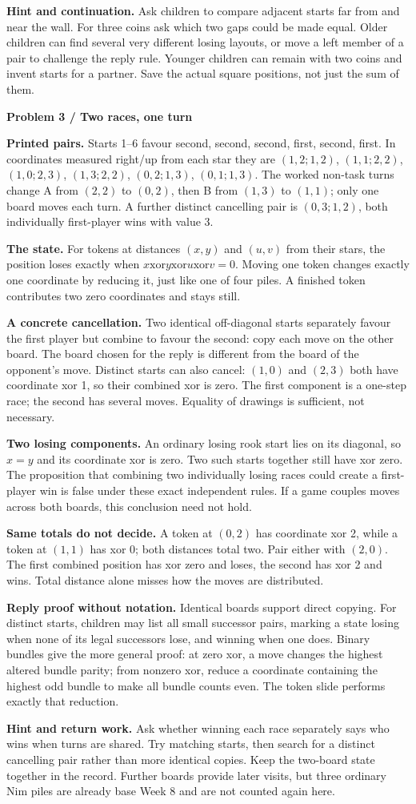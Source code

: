 \documentclass[11pt]{article}
\newcommand{\parttitle}[1]{{\large\bfseries\color{ink}#1}\par}
\newcommand{\labelled}[2]{\textbf{#1} #2\par}
\begin{document}
\labelled{Hint and continuation.}{Ask children to compare adjacent starts far from and near the wall. For three coins ask which two gaps could be made equal. Older children can find several very different losing layouts, or move a left member of a pair to challenge the reply rule. Younger children can remain with two coins and invent starts for a partner. Save the actual square positions, not just the sum of them.}
\newpage
\parttitle{Problem 3 / Two races, one turn}
\labelled{Printed pairs.}{Starts 1--6 favour second, second, second, first, second, first. In coordinates measured right/up from each star they are $(1,2;1,2)$, $(1,1;2,2)$, $(1,0;2,3)$, $(1,3;2,2)$, $(0,2;1,3)$, $(0,1;1,3)$. The worked non-task turns change A from $(2,2)$ to $(0,2)$, then B from $(1,3)$ to $(1,1)$; only one board moves each turn. A further distinct cancelling pair is $(0,3;1,2)$, both individually first-player wins with value 3.}
\labelled{The state.}{For tokens at distances $(x,y)$ and $(u,v)$ from their stars, the position loses exactly when $x\mathbin{\mathrm{xor}}y\mathbin{\mathrm{xor}}u\mathbin{\mathrm{xor}}v=0$. Moving one token changes exactly one coordinate by reducing it, just like one of four piles. A finished token contributes two zero coordinates and stays still.}
\labelled{A concrete cancellation.}{Two identical off-diagonal starts separately favour the first player but combine to favour the second: copy each move on the other board. The board chosen for the reply is different from the board of the opponent's move. Distinct starts can also cancel: $(1,0)$ and $(2,3)$ both have coordinate xor 1, so their combined xor is zero. The first component is a one-step race; the second has several moves. Equality of drawings is sufficient, not necessary.}
\labelled{Two losing components.}{An ordinary losing rook start lies on its diagonal, so $x=y$ and its coordinate xor is zero. Two such starts together still have xor zero. The proposition that combining two individually losing races could create a first-player win is false under these exact independent rules. If a game couples moves across both boards, this conclusion need not hold.}
\labelled{Same totals do not decide.}{A token at $(0,2)$ has coordinate xor 2, while a token at $(1,1)$ has xor 0; both distances total two. Pair either with $(2,0)$. The first combined position has xor zero and loses, the second has xor 2 and wins. Total distance alone misses how the moves are distributed.}
\labelled{Reply proof without notation.}{Identical boards support direct copying. For distinct starts, children may list all small successor pairs, marking a state losing when none of its legal successors lose, and winning when one does. Binary bundles give the more general proof: at zero xor, a move changes the highest altered bundle parity; from nonzero xor, reduce a coordinate containing the highest odd bundle to make all bundle counts even. The token slide performs exactly that reduction.}
\labelled{Hint and return work.}{Ask whether winning each race separately says who wins when turns are shared. Try matching starts, then search for a distinct cancelling pair rather than more identical copies. Keep the two-board state together in the record. Further boards provide later visits, but three ordinary Nim piles are already base Week 8 and are not counted again here.}
\end{document}
